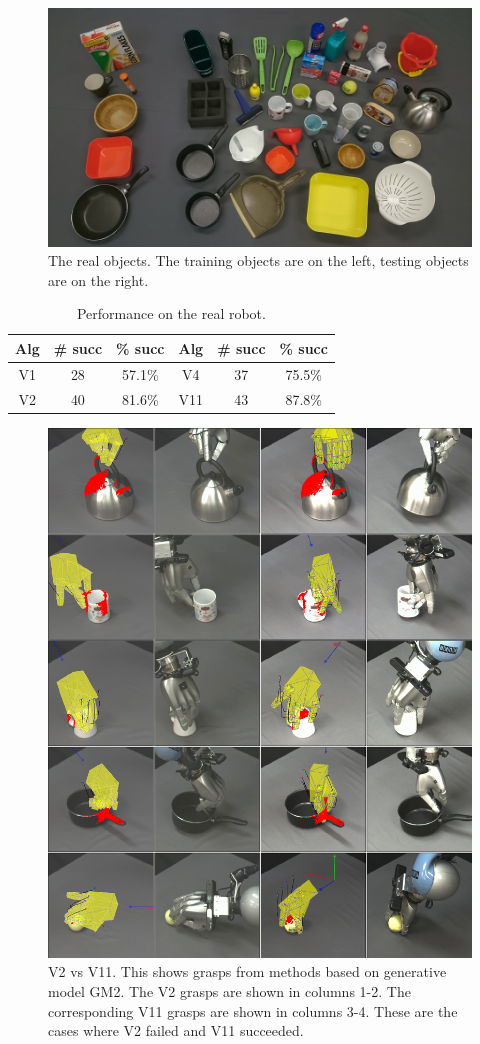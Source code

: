 
\begin{figure}[t]
\begin{center}
  \includegraphics[width=0.75\linewidth]{images/objects.jpg}
  \end{center}
  \caption{The real objects. The training objects are on the left, testing objects are on the right.}
  \label{fig:real-objects}
\end{figure}

\begin{table}[b]
\small
\begin{center}
\caption{Performance on the real robot. \label{tab:robot-results}}
\begin{tabular}{|c|c|c|c|c|c|} \hline
Alg & \# succ & \% succ & Alg & \# succ & \% succ \\ \hline
V1  &  28 & 57.1\% & V4   & 37  & 75.5\% \\
V2  & 40 & 81.6\% & V11 & 43  & 87.8\% \\
\hline
\end{tabular}
\end{center}
\end{table}

\begin{figure}[t]
\begin{center}
\includegraphics[width=0.5\columnwidth]{plots/A6fA10s_vertical.png}
\caption{V2 vs V11. This shows grasps from methods based on generative model GM2. The V2 grasps are shown in columns 1-2. The corresponding V11 grasps are shown in columns 3-4. These are the cases where V2 failed and V11 succeeded. \label{fig:v2fv11s}}
\end{center}
\end{figure}

